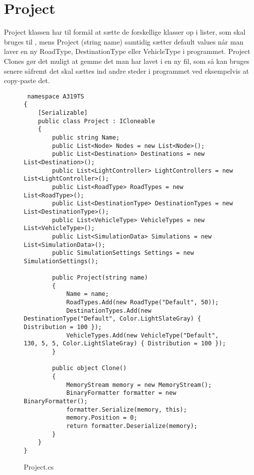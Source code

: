 \section{Project}

Project klassen har til formål at sætte de forskellige klasser op i lister, som skal bruges til , mens Project (string name) samtidig sætter default values når man laver en ny RoadType, DestinationType eller VehicleType i programmet. Project Clones gør det muligt at gemme det man har lavet i en ny fil, som så kan bruges senere såfremt det skal sættes ind andre steder i programmet ved eksempelvis at copy-paste det. 

\begin{figure}[H]
\begin{lstlisting} namespace A319TS
{ 
    [Serializable]
    public class Project : ICloneable
    {
        public string Name;
        public List<Node> Nodes = new List<Node>();
        public List<Destination> Destinations = new List<Destination>();
        public List<LightController> LightControllers = new List<LightController>();
        public List<RoadType> RoadTypes = new List<RoadType>();
        public List<DestinationType> DestinationTypes = new List<DestinationType>();
        public List<VehicleType> VehicleTypes = new List<VehicleType>();
        public List<SimulationData> Simulations = new List<SimulationData>();
        public SimulationSettings Settings = new SimulationSettings();
        
        public Project(string name)
        {
            Name = name;
            RoadTypes.Add(new RoadType("Default", 50));
            DestinationTypes.Add(new DestinationType("Default", Color.LightSlateGray) { Distribution = 100 });
            VehicleTypes.Add(new VehicleType("Default", 130, 5, 5, Color.LightSlateGray) { Distribution = 100 });
        }

        public object Clone()
        {
            MemoryStream memory = new MemoryStream();
            BinaryFormatter formatter = new BinaryFormatter();
            formatter.Serialize(memory, this);
            memory.Position = 0;
            return formatter.Deserialize(memory);
        }
    }
}
\end{lstlisting}
\caption{Project.cs}\label{project.cs}
\end{figure}

